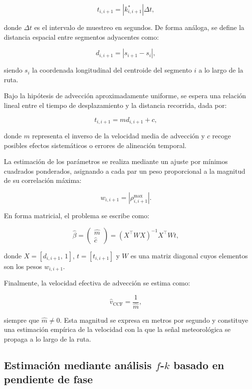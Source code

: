 \documentclass[
  spanish,
  us-letterpaper,
]{scrreprt}
\numberwithin{equation}{section}
\begin{document}
\[
t_{i,i+1} = |k^*_{i,i+1}| \Delta t,
\]

donde \(\Delta t\) es el intervalo de muestreo en segundos. De forma
análoga, se define la distancia espacial entre segmentos adyacentes
como:

\[
d_{i,i+1} = |s_{i+1} - s_i|,
\]

siendo \(s_i\) la coordenada longitudinal del centroide del segmento
\(i\) a lo largo de la ruta.

Bajo la hipótesis de advección aproximadamente uniforme, se espera una
relación lineal entre el tiempo de desplazamiento y la distancia
recorrida, dada por:

\[
t_{i,i+1} = m d_{i,i+1} + c,
\]

donde \(m\) representa el inverso de la velocidad media de advección y
\(c\) recoge posibles efectos sistemáticos o errores de alineación
temporal.

La estimación de los parámetros se realiza mediante un ajuste por
mínimos cuadrados ponderados, asignando a cada par un peso proporcional
a la magnitud de su correlación máxima:

\[
w_{i,i+1} = |\rho^{\max}_{i,i+1}|.
\]

En forma matricial, el problema se escribe como:

\[
\hat{\beta} = 
\begin{pmatrix}
\hat{m} \\
\hat{c}
\end{pmatrix}
= (X^\top W X)^{-1} X^\top W t,
\]

donde \(X = [d_{i,i+1},\, 1]\), \(t = [t_{i,i+1}]\) y \(W\) es una
matriz diagonal cuyos elementos son los pesos \(w_{i,i+1}\).

Finalmente, la velocidad efectiva de advección se estima como:

\[
\hat{v}_{\text{CCF}} = \frac{1}{\hat{m}},
\]

siempre que \(\hat{m} \neq 0\). Esta magnitud se expresa en metros por
segundo y constituye una estimación empírica de la velocidad con la que
la señal meteorológica se propaga a lo largo de la ruta.

\subsection{\texorpdfstring{Estimación mediante análisis \(f\)-\(k\)
basado en pendiente de
fase}{Estimación mediante análisis f-k basado en pendiente de fase}}\label{estimaciuxf3n-mediante-anuxe1lisis-f-k-basado-en-pendiente-de-fase}
\end{document}
